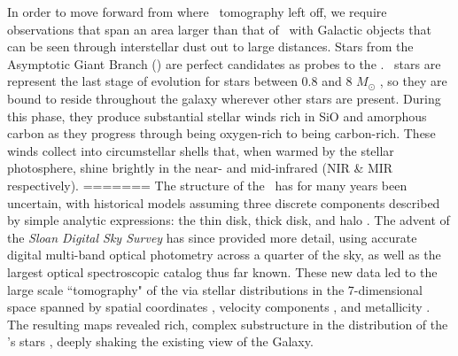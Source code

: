 In order to move forward from where \sdss\, tomography left off, we require observations that span an area larger than that of \sdss\, with Galactic objects that can be seen through interstellar dust out to large distances. Stars from the Asymptotic Giant Branch (\agb) are perfect candidates as probes to the \mw. \agb\, stars are represent the last stage of evolution for stars between 0.8 and 8 $M_\odot$ \citep{1983ARA&A..21..271I, 2005ARA&A..43..435H}, so they are bound to reside throughout the galaxy wherever other stars are present. During this phase, they produce substantial stellar winds \citep[$10^{-7} < \dot{M} < 10^{-4} M_\odot$ yr$^{-1}$,][]{2002A&A...391.1053O} rich in SiO and amorphous carbon as they progress through being oxygen-rich to being carbon-rich. These winds collect into circumstellar shells that, when warmed by the stellar photosphere, shine brightly in the near- and mid-infrared (NIR \& MIR respectively). 
=======
The structure of the \mw\, has for many years been uncertain, with historical models assuming three discrete components described by simple analytic expressions: the thin disk, thick disk, and halo \citep{1980ApJS...44...73B, 1989ARA&A..27..555G,1993ARA&A..31..575M}. 
The advent of the \emph{Sloan Digital Sky Survey} \citep[\sdss, ][]{2000AJ....120.1579Y} has since provided more detail, using accurate digital multi-band optical photometry across a quarter of the sky, as well as the largest optical spectroscopic catalog thus far known. 
These new data led to the large scale ``tomography" of the \mw\; via stellar distributions in the 7-dimensional space spanned by spatial coordinates \citep{2008ApJ...673..864J}, velocity components \citep{2010ApJ...716....1B}, and metallicity \citep{2008ApJ...684..287I}. The resulting maps revealed rich, complex substructure in the distribution of the \mw's stars \citep[e.g.][]{2000AJ....120..963I,2000ApJ...540..825Y,2001ApJ...554L..33V,2002ApJ...569..245N,2003ApJ...599.1082M,2006ApJ...642L.137B,2006ApJ...651L..29G,2006AJ....132..714V}, deeply shaking the existing view of the Galaxy. 

